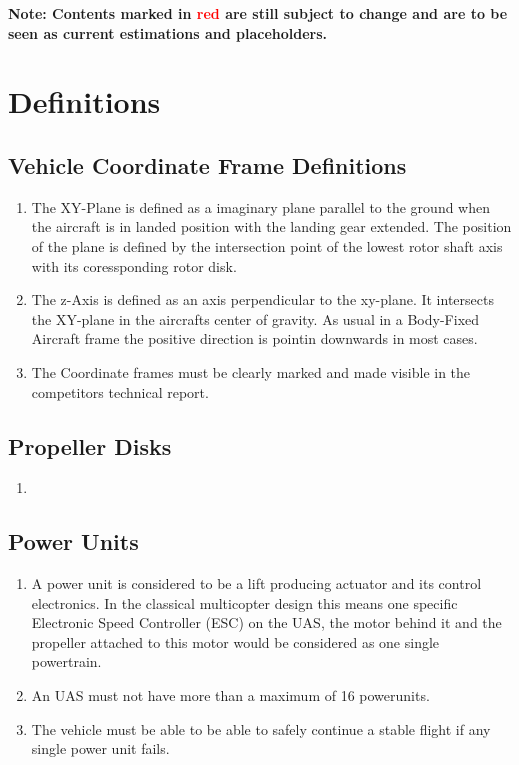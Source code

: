 \documentclass{article}
\begin{document}


\tableofcontents{}
\newpage

{\bf Note: Contents marked in \textcolor{red}{red} are still subject to change and are to be seen as current estimations and placeholders.}

\section{Definitions}
\subsection{Vehicle Coordinate Frame Definitions}
\begin{enumerate}
  \item The XY-Plane is defined as a imaginary plane parallel to the ground when the aircraft is in landed position with the landing gear extended. The position of the plane is defined by the intersection point of the lowest rotor shaft axis with its coressponding rotor disk.
  \item The z-Axis is defined as an axis perpendicular to the xy-plane. It intersects the XY-plane in the aircrafts center of gravity. As usual in a Body-Fixed Aircraft frame the positive direction is pointin downwards in most cases.
  \item The Coordinate frames must be clearly marked and made visible in the competitors technical report. 
\end{enumerate}

\subsection{Propeller Disks}
\begin{enumerate}
  \item 
\end{enumerate}

\subsection{Power Units}
\begin{enumerate}
  \item A power unit is considered to be a lift producing actuator and its control electronics. In the classical multicopter design this means one specific Electronic Speed Controller (ESC) on the UAS, the motor behind it and the propeller attached to this motor would be considered as one single powertrain.
  \item An UAS must not have more than a maximum of 16 powerunits.
  \item The vehicle must be able to be able to safely continue a stable flight if any single power unit fails.  
\end{enumerate}
\end{document}
